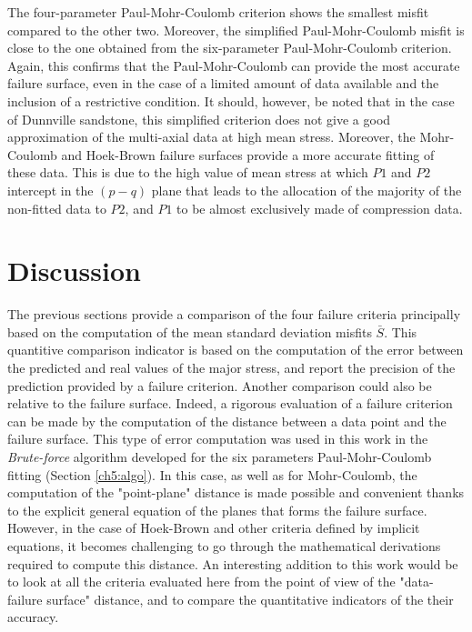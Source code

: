 The four-parameter Paul-Mohr-Coulomb criterion shows the smallest misfit compared to the other two. Moreover, the simplified Paul-Mohr-Coulomb misfit is close to the one obtained from the six-parameter Paul-Mohr-Coulomb criterion. Again, this confirms that the Paul-Mohr-Coulomb can provide the most accurate failure surface, even in the case of a limited amount of data available and the inclusion of a restrictive condition. It should, however, be noted that in the case of Dunnville sandstone, this simplified criterion does not give a good approximation of the multi-axial data at high mean stress. Moreover, the Mohr-Coulomb and Hoek-Brown failure surfaces provide a more accurate fitting of these data. This is due to the high value of mean stress at which $P1$ and $P2$ intercept in the $(p-q)$ plane that leads to the allocation of the majority of the non-fitted data to $P2$, and $P1$ to be almost exclusively made of compression data.  

\section{Discussion}

The previous sections provide a comparison of the four failure criteria principally based on the computation of the mean standard deviation misfits $\bar{S}$. This quantitive comparison indicator is based on the computation of the error between the predicted and real values of the major stress, and report the precision of the prediction provided by a failure criterion. Another comparison could also be relative to the failure surface. Indeed, a rigorous evaluation  of a failure criterion can be made by the computation of the distance between a data point and the failure surface. This type of error computation was used in this work in the \emph{Brute-force} algorithm developed for the six parameters Paul-Mohr-Coulomb fitting (Section \ref{ch5:algo}). In this case, as well as for Mohr-Coulomb, the computation of the "point-plane" distance is made possible and convenient thanks to the explicit general equation of the planes that forms the failure surface. However, in the case of Hoek-Brown and other criteria defined by implicit equations, it becomes challenging to go through the mathematical derivations required to compute this distance. An interesting addition to this work would be to look at all the criteria evaluated here from the point of view of the "data-failure surface" distance, and to compare the quantitative indicators of the their accuracy.

